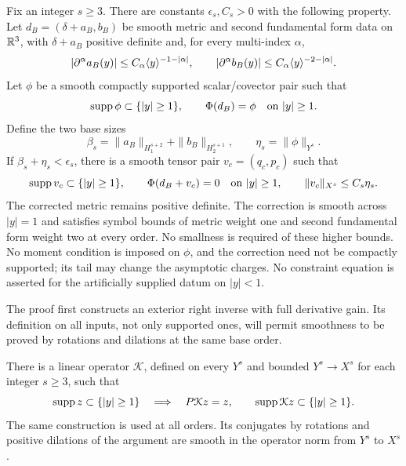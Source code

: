 \begin{proposition}
\label{pk:constraint-nonlinear}
Fix an integer $s\ge3$. There are constants $\epsilon_s,C_s>0$
with the following property. Let $d_B=(\delta+a_B,b_B)$ be smooth
metric and second fundamental form data on $\mathbb R^3$, with
$\delta+a_B$ positive definite and, for every multi-index $\alpha$,
\[
 |\partial^\alpha a_B(y)|\le C_\alpha\langle y\rangle^{-1-|\alpha|},
 \qquad
 |\partial^\alpha b_B(y)|\le C_\alpha\langle y\rangle^{-2-|\alpha|}.
\]
Let $\phi$ be a smooth compactly supported scalar/covector pair such that
\[
 \operatorname{supp}\phi\subset\{|y|\ge1\},\qquad
 \Phi(d_B)=\phi\quad\hbox{on }|y|\ge1.
\]
Define the two base sizes
\[
 \beta_s=\|a_B\|_{H^{s+2}_1}+\|b_B\|_{H^{s+1}_2},
 \qquad \eta_s=\|\phi\|_{Y^s}.
\]
If $\beta_s+\eta_s<\epsilon_s$, there is a smooth tensor pair
$v_c=(q_c,p_c)$ such that
\[
 \operatorname{supp} v_c\subset\{|y|\ge1\},\qquad
 \Phi(d_B+v_c)=0\quad\hbox{on }|y|\ge1,
 \qquad \|v_c\|_{X^s}\le C_s\eta_s.
\]
The corrected metric remains positive definite. The correction is smooth
across $|y|=1$ and satisfies symbol bounds of metric weight one and
second fundamental form weight two at every order. No smallness is
required of these higher bounds. No moment condition is imposed on
$\phi$, and the correction need not be compactly supported; its tail
may change the asymptotic charges. No constraint equation is asserted
for the artificially supplied datum on $|y|<1$.
\end{proposition}

The proof first constructs an exterior right inverse with full derivative
gain. Its definition on all inputs, not only supported ones, will permit
smoothness to be proved by rotations and dilations at the same base order.

\begin{lemma}
\label{pk:constraint-linear}
There is a linear operator \(\mathcal K\), defined on every \(Y^s\) and
bounded \(Y^s\to X^s\) for each integer \(s\geq3\), such that
\begin{equation}
 \operatorname{supp} z\subset\{|y|\geq1\}
 \quad\Longrightarrow\quad
 P\mathcal Kz=z,\qquad
 \operatorname{supp}\mathcal Kz\subset\{|y|\geq1\}.
 \label{pk:constraint-right-inverse}
\end{equation}
The same construction is used at all orders.  Its conjugates by rotations
and positive dilations of the argument are smooth in the operator norm
from \(Y^s\) to \(X^s\).
\end{lemma}

